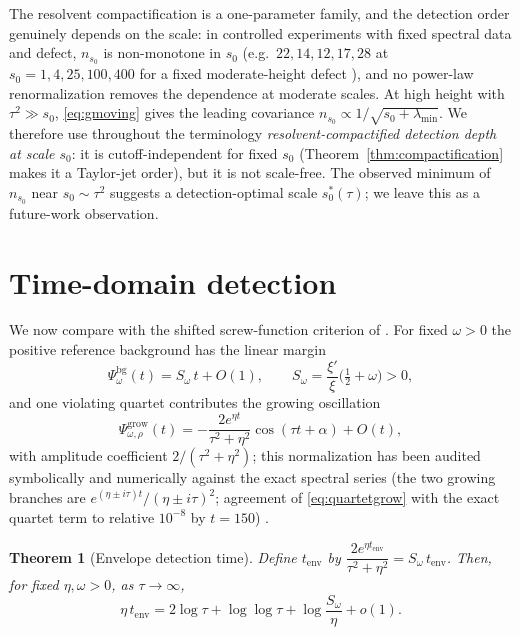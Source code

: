 \documentclass[11pt]{amsart}
\newtheorem{theorem}{Theorem}[section]
\theoremstyle{definition}
\theoremstyle{remark}
\begin{document}
The resolvent compactification is a one-parameter family, and the detection
order genuinely depends on the scale: in controlled experiments with fixed
spectral data and defect, $n_{s_0}$ is non-monotone in $s_0$ (e.g.\
$22,14,12,17,28$ at $s_0=1,4,25,100,400$ for a fixed moderate-height defect
\cite{LabRecord}), and no power-law renormalization removes the dependence
at moderate scales. At high height with $\tau^2\gg s_0$, \eqref{eq:gmoving}
gives the leading covariance $n_{s_0}\propto1/\sqrt{s_0+\lambda_{\min}}$.
We therefore use throughout the terminology \emph{resolvent-compactified
detection depth at scale $s_0$}: it is cutoff-independent for fixed $s_0$
(Theorem~\ref{thm:compactification} makes it a Taylor-jet order), but it is
not scale-free. The observed minimum of $n_{s_0}$ near $s_0\sim\tau^2$
suggests a detection-optimal scale $s_0^*(\tau)$; we leave this as a
future-work observation.

\section{Time-domain detection}\label{sec:time}

We now compare with the shifted screw-function criterion of
\cite{Suzuki2023,MarginPaper}. For fixed $\omega>0$ the positive reference
background has the linear margin
\[
\Psi^{\mathrm{bg}}_\omega(t)=S_\omega\,t+O(1),
\qquad
S_\omega=\frac{\xi'}{\xi}\Big(\tfrac12+\omega\Big)>0 ,
\]
and one violating quartet contributes the growing oscillation
\begin{equation}\label{eq:quartetgrow}
\Psi^{\mathrm{grow}}_{\omega,\rho}(t)
=-\frac{2e^{\eta t}}{\tau^2+\eta^2}\cos(\tau t+\alpha)+O(t),
\end{equation}
with amplitude coefficient $2/(\tau^2+\eta^2)$; this normalization has been
audited symbolically and numerically against the exact spectral series (the
two growing branches are $e^{(\eta\pm i\tau)t}/(\eta\pm i\tau)^2$;
agreement of \eqref{eq:quartetgrow} with the exact quartet term to relative
$10^{-8}$ by $t=150$) \cite{LabRecord,MarginPaper}.

\begin{theorem}[Envelope detection time]\label{thm:envelope}
Define $t_{\mathrm{env}}$ by
$\dfrac{2e^{\eta t_{\mathrm{env}}}}{\tau^2+\eta^2}=S_\omega\,
t_{\mathrm{env}}$. Then, for fixed $\eta,\omega>0$, as $\tau\to\infty$,
\[
\eta\,t_{\mathrm{env}}
=2\log\tau+\log\log\tau+\log\frac{S_\omega}{\eta}+o(1).
\]
\end{theorem}
\end{document}
